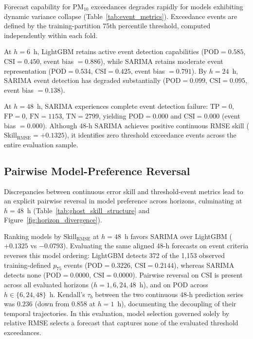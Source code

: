 \documentclass[12pt]{article}
\begin{document}
Forecast capability for $\mathrm{PM}_{10}$ exceedances degrades rapidly for models exhibiting dynamic variance collapse (Table~\ref{tab:event_metrics}). Exceedance events are defined by the training-partition 75th percentile threshold, computed independently within each fold.

At $h = 6$~h, LightGBM retains active event detection capabilities ($\mathrm{POD} = 0.585$, $\mathrm{CSI} = 0.450$, event bias $= 0.886$), while SARIMA retains moderate event representation ($\mathrm{POD} = 0.534$, $\mathrm{CSI} = 0.425$, event bias $= 0.791$). By $h = 24$~h, SARIMA event detection has degraded substantially ($\mathrm{POD} = 0.099$, $\mathrm{CSI} = 0.095$, event bias $= 0.138$).

At $h = 48$~h, SARIMA experiences complete event detection failure: $\mathrm{TP} = 0$, $\mathrm{FP} = 0$, $\mathrm{FN} = 1153$, $\mathrm{TN} = 2799$, yielding $\mathbf{\mathrm{POD} = 0.000}$ and $\mathbf{\mathrm{CSI} = 0.000}$ (event bias $= 0.000$). Although 48-h SARIMA achieves positive continuous RMSE skill ($\mathrm{Skill}_\mathrm{RMSE} = +0.1325$), it identifies zero threshold exceedance events across the entire evaluation sample.

\subsection{Pairwise Model-Preference Reversal}
\label{sec:results_rank_reversal}

Discrepancies between continuous error skill and threshold-event metrics lead to an explicit pairwise reversal in model preference across horizons, culminating at $h = 48$~h (Table~\ref{tab:ghost_skill_structure} and Figure~\ref{fig:horizon_divergence}).

Ranking models by $\mathrm{Skill}_\mathrm{RMSE}$ at $h = 48$~h favors SARIMA over LightGBM ($+0.1325$ vs $-0.0793$). Evaluating the same aligned 48-h forecasts on event criteria reverses this model ordering: LightGBM detects 372 of the 1,153 observed training-defined $p_{75}$ events ($\mathrm{POD} = 0.3226$, $\mathrm{CSI} = 0.2144$), whereas SARIMA detects none ($\mathrm{POD} = 0.0000$, $\mathrm{CSI} = 0.0000$). Pairwise reversal on CSI is present across all evaluated horizons ($h = 1, 6, 24, 48$~h), and on POD across $h \in \{6, 24, 48\}$~h. Kendall's $\tau_b$ between the two continuous 48-h prediction series was $0.236$ (down from $0.858$ at $h = 1$~h), documenting the decoupling of their temporal trajectories. In this evaluation, model selection governed solely by relative RMSE selects a forecast that captures none of the evaluated threshold exceedances.
\end{document}
